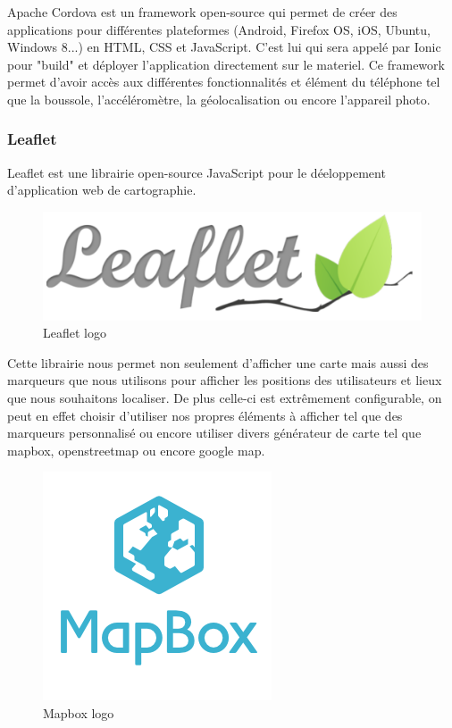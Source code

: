 \documentclass[french]{article}
\begin{document}
	Apache Cordova est un framework open-source qui permet de créer des applications pour différentes plateformes (Android, Firefox OS, iOS, Ubuntu, Windows 8...) en HTML, CSS et JavaScript. C'est lui qui sera appelé par Ionic pour "build" et déployer l'application directement sur le materiel.
	Ce framework permet d'avoir accès aux différentes fonctionnalités et élément du téléphone tel que la boussole, l'accéléromètre, la géolocalisation ou encore l'appareil photo.
	
	\subsubsection{Leaflet}
	
	Leaflet est une librairie open-source JavaScript pour le déeloppement d'application web de cartographie.
	
	\begin{figure}[H]
		\centering
		\includegraphics[scale=0.4]{../images/leaflet-logo.png}
		\caption{Leaflet logo}
		\label{Leaflet logo}
	\end{figure} 
	
	
	Cette librairie nous permet non seulement d'afficher une carte mais aussi des marqueurs que nous utilisons pour afficher les positions des utilisateurs et lieux que nous souhaitons localiser. De plus celle-ci est extrêmement configurable, on peut en effet choisir d'utiliser nos propres éléments à afficher tel que des marqueurs personnalisé ou encore utiliser divers générateur de carte tel que mapbox, openstreetmap ou encore google map.
	
	\begin{figure}[H]
		\centering
		\includegraphics[scale=0.4]{../images/mapbox-logo.png}
		\caption{Mapbox logo}
		\label{Mapbox logo}
	\end{figure} 
	
\end{document}

